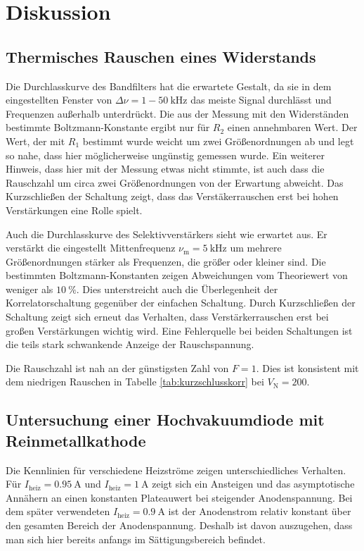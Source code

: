 \section{Diskussion}
\label{sec:Diskussion}

\subsection{Thermisches Rauschen eines Widerstands}

Die Durchlasskurve des Bandfilters hat die erwartete Gestalt, da sie in dem eingestellten Fenster von $\Delta \nu = 1-\SI{50}{\kilo\hertz}$ das meiste Signal durchlässt und Frequenzen außerhalb unterdrückt.
Die aus der Messung mit den Widerständen bestimmte Boltzmann-Konstante ergibt nur für $R_2$ einen annehmbaren Wert. Der Wert, der mit $R_1$ bestimmt wurde weicht um zwei Größenordnungen ab und legt so nahe, dass hier möglicherweise ungünstig gemessen wurde.
Ein weiterer Hinweis, dass hier mit der Messung etwas nicht stimmte, ist auch dass die Rauschzahl um circa zwei Größenordnungen von der Erwartung abweicht.
Das Kurzschließen der Schaltung zeigt, dass das Verstäkerrauschen erst bei hohen Verstärkungen eine Rolle spielt.

Auch die Durchlasskurve des Selektivverstärkers sieht wie erwartet aus. Er verstärkt die eingestellt Mittenfrequenz $\nu_\text{m} = \SI{5}{\kilo\hertz}$ um mehrere Größenordnungen stärker als Frequenzen, die größer oder kleiner sind.
Die bestimmten Boltzmann-Konstanten zeigen Abweichungen vom Theoriewert von weniger als $\SI{10}{\percent}$. Dies unterstreicht auch die Überlegenheit der Korrelatorschaltung gegenüber der einfachen Schaltung. Durch Kurzschließen der Schaltung zeigt sich erneut das Verhalten, dass Verstärkerrauschen erst bei großen Verstärkungen wichtig wird.
Eine Fehlerquelle bei beiden Schaltungen ist die teils stark schwankende Anzeige der Rauschspannung.

Die Rauschzahl ist nah an der günstigsten Zahl von $F = 1$. Dies ist konsistent mit dem niedrigen Rauschen in Tabelle \ref{tab:kurzschlusskorr} bei $V_\text{N} = 200$.

\subsection{Untersuchung einer Hochvakuumdiode mit Reinmetallkathode}

Die Kennlinien für verschiedene Heizströme zeigen unterschiedliches Verhalten. Für $I_\text{heiz} = \SI{0.95}{\ampere}$ und $I_\text{heiz} = \SI{1}{\ampere}$ zeigt sich ein Ansteigen und das asymptotische Annähern an einen konstanten Plateauwert bei steigender Anodenspannung. Bei dem später verwendeten $I_\text{heiz} = \SI{0.9}{\ampere}$ ist der Anodenstrom relativ konstant über den gesamten Bereich der Anodenspannung. Deshalb ist davon auszugehen, dass man sich hier bereits anfangs im Sättigungsbereich befindet.


